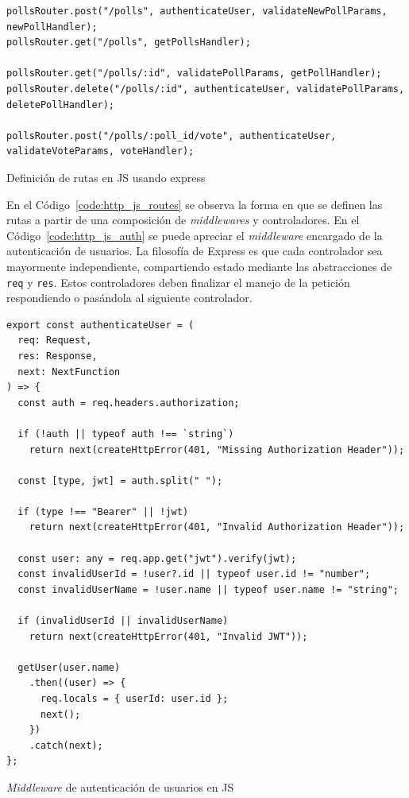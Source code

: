 \documentclass[11pt]{article}
\newcommand{\english}[1]{\textit{#1}}
\begin{document}
\begin{listing}[h]
\begin{verbatim}
pollsRouter.post("/polls", authenticateUser, validateNewPollParams, newPollHandler);
pollsRouter.get("/polls", getPollsHandler);

pollsRouter.get("/polls/:id", validatePollParams, getPollHandler);
pollsRouter.delete("/polls/:id", authenticateUser, validatePollParams, deletePollHandler);

pollsRouter.post("/polls/:poll_id/vote", authenticateUser, validateVoteParams, voteHandler);
\end{verbatim}
\caption{Definición de rutas en JS usando express}
\label{code:http_js_routes}
\end{listing}

En el Código~\ref{code:http_js_routes} se observa la forma en que se definen las rutas a partir de una composición de \textit{middlewares} y controladores. En el Código~\ref{code:http_js_auth} se puede apreciar el \english{middleware} encargado de la autenticación de usuarios. La filosofía de Express es que cada controlador sea mayormente independiente, compartiendo estado mediante las abstracciones de \lstinline{req} y \lstinline{res}. Estos controladores deben finalizar el manejo de la petición respondiendo o pasándola al siguiente controlador.

\begin{listing}[h]
\begin{verbatim}
export const authenticateUser = (
  req: Request,
  res: Response,
  next: NextFunction
) => {
  const auth = req.headers.authorization;

  if (!auth || typeof auth !== `string`)
    return next(createHttpError(401, "Missing Authorization Header"));

  const [type, jwt] = auth.split(" ");

  if (type !== "Bearer" || !jwt)
    return next(createHttpError(401, "Invalid Authorization Header"));

  const user: any = req.app.get("jwt").verify(jwt);
  const invalidUserId = !user?.id || typeof user.id != "number";
  const invalidUserName = !user.name || typeof user.name != "string";

  if (invalidUserId || invalidUserName)
    return next(createHttpError(401, "Invalid JWT"));

  getUser(user.name)
    .then((user) => {
      req.locals = { userId: user.id };
      next();
    })
    .catch(next);
};
\end{verbatim}
\caption{\english{Middleware} de autenticación de usuarios en JS}
\label{code:http_js_auth}
\end{listing}
\end{document}
